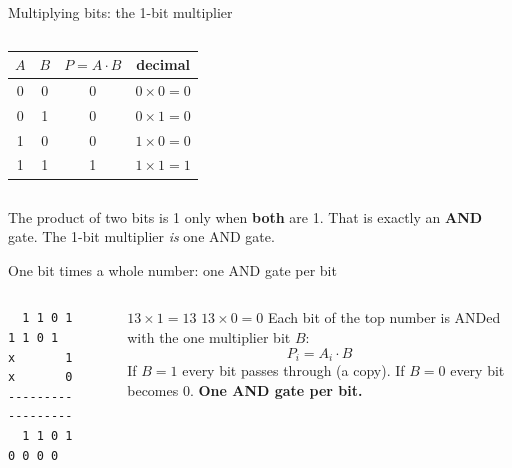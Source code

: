 \documentclass[aspectratio=169,10pt]{beamer}
\begin{document}
\begin{frame}{Multiplying bits: the 1-bit multiplier}
\begin{columns}[c]
\begin{center}
\begin{tabular}{cc|c|c}
$A$&$B$&$P=A\cdot B$&decimal\\\hline
0&0&0&$0\times0=0$\\
0&1&0&$0\times1=0$\\
1&0&0&$1\times0=0$\\
1&1&1&$1\times1=1$
\end{tabular}
\end{center}
\begin{center}
\end{center}
\end{columns}
\vspace{4pt}
The product of two bits is 1 only when \textbf{both} are 1. That is exactly an \textbf{AND} gate. The 1-bit multiplier \emph{is} one AND gate.
\end{frame}

\begin{frame}[fragile]{One bit times a whole number: one AND gate per bit}
\begin{columns}[c]
\begin{verbatim}
  1 1 0 1      1 1 0 1
x       1    x       0
---------    ---------
  1 1 0 1      0 0 0 0
\end{verbatim}
$13\times1=13$ \qquad $13\times0=0$
Each bit of the top number is ANDed with the one multiplier bit $B$:
\[ P_i = A_i\cdot B \]
If $B=1$ every bit passes through (a copy). If $B=0$ every bit becomes 0. \textbf{One AND gate per bit.}
\end{columns}
\end{frame}
\end{document}
